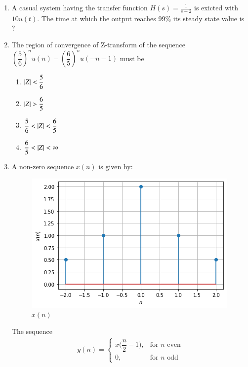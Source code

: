 \begin{enumerate}[label=\arabic*.,ref=\theenumi]
\item A casual system having the transfer function $H(s)=\frac{1}{s+2}$ is exicted with $10u(t)$. The time at which the output reaches 99\% its steady state value is ?
\\
\solution



\item The region of convergence of Z-transform of the sequence $\left(\dfrac{5}{6}\right)^nu(n) -\left(\dfrac{6}{5}\right)^nu(-n-1)$ must be
\begin{enumerate}[label = (\Alph*)]
\setlength\itemsep{0.7em}
    \item $\left\vert Z\right\vert < \dfrac{5}{6}$
    \item $\left\vert Z\right\vert > \dfrac{6}{5}$
    \item $\dfrac{5}{6} < \left\vert Z\right\vert < \dfrac{6}{5}$
    \item $\dfrac{6}{5} < \left\vert Z\right\vert < \infty$
\end{enumerate}
\solution

\item 
A non-zero sequence $x(n)$ is given by:
\begin{figure}[!ht]
    \centering
    \includegraphics[width=\columnwidth] {solutions/ec/2005/85/Figures/Gate_Assignment_3_Fig_1.png}
    \caption{$x(n)$}
    \label{ec/2005/85/x(n)}
\end{figure}
The sequence
\begin{align}
y(n)=  
\begin{cases}
x\Bigg(\dfrac{n}{2}-1\Bigg), & \text{for } n \text{ even}\\
0, & \text{for } n \text{ odd}\nonumber
\end{cases}
\end{align}

\end{enumerate}
